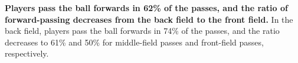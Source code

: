 \textbf{Players pass the ball forwards in 62\% of the passes, and the ratio of forward-passing decreases from the back field to the front field.} In the back field, players pass the ball forwards in 74\% of the passes, and the ratio decreases to 61\% and 50\% for middle-field passes and front-field passes, respectively.


